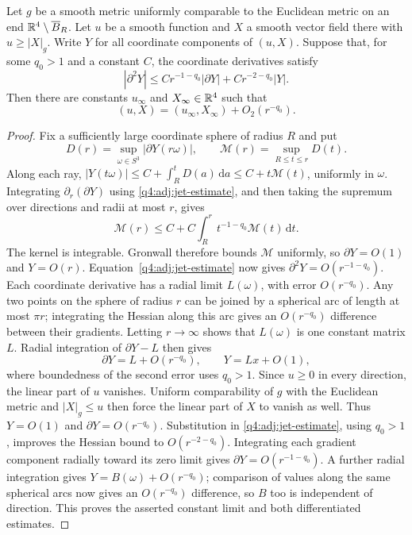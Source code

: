 \begin{lemma}
\label{q4:adj:causal-jet-asymptotics}
Let $g$ be a smooth metric uniformly comparable to the Euclidean metric
on an end $\mathbb R^4\setminus\overline B_R$. Let $u$ be a smooth function
and $X$ a smooth vector field there with $u\ge |X|_g$. Write $Y$ for
all coordinate components of $(u,X)$. Suppose that, for some $q_0>1$
and a constant $C$, the coordinate derivatives satisfy
\begin{equation}
 |\partial^2Y|
 \le C r^{-1-q_0}|\partial Y|+C r^{-2-q_0}|Y|.
 \label{q4:adj:jet-estimate}
\end{equation}
Then there are constants $u_\infty$ and $X_\infty\in\mathbb R^4$ such that
\[
 (u,X)=(u_\infty,X_\infty)+O_2(r^{-q_0}).
\]
\end{lemma}

\begin{proof}
Fix a sufficiently large coordinate sphere of radius $R$ and put
\[
 D(r)=\sup_{\omega\in S^3}|\partial Y(r\omega)|,
 \qquad \mathcal M(r)=\sup_{R\le t\le r}D(t).
\]
Along each ray,
$|Y(t\omega)|\le C+\int_R^tD(a)\,\mathrm da\le C+t\mathcal M(t)$,
uniformly in $\omega$.  Integrating
$\partial_r(\partial Y)$ using \eqref{q4:adj:jet-estimate}, and then taking
the supremum over directions and radii at most $r$, gives
\[
 \mathcal M(r)\le C+C\int_R^r t^{-1-q_0}\mathcal M(t)\,\mathrm dt.
\]
The kernel is integrable.  Gronwall therefore bounds $\mathcal M$ uniformly,
so $\partial Y=O(1)$ and $Y=O(r)$.
Equation~\eqref{q4:adj:jet-estimate} now gives
$\partial^2Y=O(r^{-1-q_0})$.  Each coordinate derivative has a radial limit
$L(\omega)$, with error $O(r^{-q_0})$.  Any two points on the sphere of
radius $r$ can be joined by a spherical arc of length at most $\pi r$;
integrating the Hessian along this arc gives an $O(r^{-q_0})$ difference
between their gradients.  Letting $r\to\infty$ shows that $L(\omega)$ is
one constant matrix $L$.  Radial integration of $\partial Y-L$ then gives
\[
 \partial Y=L+O(r^{-q_0}),\qquad Y=Lx+O(1),
\]
where boundedness of the second error uses $q_0>1$.
Since $u\ge0$ in every direction, the linear part of $u$ vanishes.
Uniform comparability of $g$ with the Euclidean metric and $|X|_g\le u$
then force the linear part of $X$ to vanish as well.  Thus $Y=O(1)$
and $\partial Y=O(r^{-q_0})$.  Substitution in
\eqref{q4:adj:jet-estimate}, using $q_0>1$, improves the Hessian bound to
$O(r^{-2-q_0})$.  Integrating each gradient component radially toward its
zero limit gives $\partial Y=O(r^{-1-q_0})$.  A further radial integration
gives $Y=B(\omega)+O(r^{-q_0})$; comparison of values along the same spherical
arcs now gives an $O(r^{-q_0})$ difference, so $B$ too is independent of
direction. This proves the asserted constant limit and both differentiated
estimates.
\end{proof}

